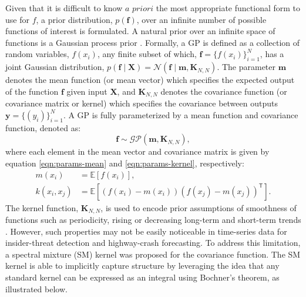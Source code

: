 \documentclass[letterpaper]{article}
\begin{document}
Given that it is difficult to know $\textit{a priori}$ the most appropriate functional form to use for \(f\), a prior distribution, \(p(\bm{f})\), over an infinite number of possible functions of interest is formulated. A natural prior over an infinite space of functions is a Gaussian process prior \citep{williams2006gaussian}. Formally, a GP is defined as a collection of random variables, \(f(x_i)\), any finite subset of which, \(\textbf{f} = \{f(x_i)\}_{i=1}^N\), has a joint Gaussian distribution, \(p(\textbf{f} \mid \textbf{X}) = \mathcal{N}(\textbf{f} \mid \textbf{m}, \textbf{K}_{N,N})\). The parameter \(\textbf{m}\) denotes the mean function (or mean vector) which specifies the expected output of the function \(\textbf{f}\) given input $\textbf{X}$, and \(\textbf{K}_{N,N}\) denotes the covariance function (or covariance matrix or kernel) which specifies the covariance between outputs \(\textbf{y} = \{(y_i)\}_{i=1}^N\). A GP is fully parameterized by a mean function and covariance function, denoted as: 
\begin{equation}\label{eqn:gpsim}
\textbf{f} \sim \mathcal{GP}(\textbf{m}, \textbf{K}_{N,N}),
\end{equation}
where each element in the mean vector and covariance matrix is given by equation \ref{eqn:params-mean} and \ref{eqn:params-kernel}, respectively:
\begin{align}
m(x_i) &=\mathbb{E}[f(x_i)], \label{eqn:params-mean}\\
k(x_i, x_j) &=\mathbb{E}[(f(x_i)-m(x_i))(f(x_j)-m(x_j))^{\mathsf{T}}] \label{eqn:params-kernel}.
\end{align}
The kernel function, $\textbf{K}_{N,N}$, is used to encode prior assumptions of smoothness of functions such as periodicity, rising or decreasing long-term and short-term trends \citep{williams2006gaussian}. However, such properties may not be easily noticeable in time-series data for insider-threat detection and highway-crash forecasting. To address this limitation, a spectral mixture (SM) kernel \citep{wilson2014covariance,wilson2015human} was proposed for the covariance function. The SM kernel is able to implicitly capture structure by leveraging the idea that any standard kernel can be expressed as an integral using Bochner’s theorem, as illustrated below.
\end{document}
